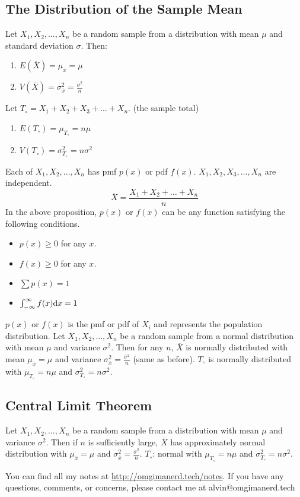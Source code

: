 \documentclass[letterpaper, 12pt]{math}
\begin{document}
\subsection*{The Distribution of the Sample Mean}
Let \( X_{1},X_{2},\dots,X_{n} \) be a random sample from a distribution with
mean \( \mu \) and standard deviation \( \sigma \). Then:
\begin{enumerate}
  \item \( E(\overline{X}) = \mu_{\overline{x}} = \mu \)
  \item \( V(\overline{X}) = \sigma_{\overline{x}}^{2} = \frac{\sigma^{2}}{n} \)
\end{enumerate}
Let \( T_{\circ} = X_{1}+X_{2}+X_{3}+\dots+X_{n} \). (the sample total)
\begin{enumerate}
  \item \( E(T_{\circ}) = \mu_{T_{\circ}} = n\mu \)
  \item \( V(T_{\circ}) = \sigma_{T_{\circ}}^{2} = n\sigma^{2} \)
\end{enumerate}
Each of \( X_{1},X_{2},\dots,X_{n} \) has pmf \( p(x) \) or pdf \( f(x) \).
\( X_{1},X_{2},X_{3},\dots,X_{n} \) are independent.
\[ \overline{X} = \frac{X_{1}+X_{2}+\dots+X_{n}}{n} \]
In the above proposition, \( p(x) \) or \( f(x) \) can be any function
satisfying the following conditions.
\begin{itemize}
  \item \( p(x)\geq 0 \) for any \( x \).
  \item \( f(x)\geq 0 \) for any \( x \).
  \item \( \sum p(x) = 1 \)
  \item \( \int_{-\infty}^{\infty}f(x)\mathrm{d}{x} = 1 \)
\end{itemize}
\( p(x) \) or \( f(x) \) is the pmf or pdf of \( X_{i} \) and represents the
population distribution. Let \( X_{1},X_{2},\dots,X_{n} \) be a random
sample from a normal distribution with mean \( \mu \) and variance
\( \sigma^{2} \). Then for any \( n \), \( \overline{X} \) is normally
distributed with mean \( \mu_{\overline{x}} = \mu \) and variance
\( \sigma_{\overline{x}}^{2} = \frac{\sigma^{2}}{n} \) (same as before).
\( T_{\circ} \) is normally distributed with \( \mu_{T_{\circ}} = n\mu \)
and \( \sigma_{T_{\circ}}^{2} = n\sigma^{2} \).

\subsection*{Central Limit Theorem}
Let \( X_{1},X_{2},\dots,X_{n} \) be a random sample from a distribution
with mean \( \mu \) and variance \( \sigma^{2} \). Then if \( n \) is
sufficiently large, \( \overline{X} \) has approximately normal distribution
with \( \mu_{\overline{x}} = \mu \) and \( \sigma_{\overline{x}}^{2} =
\frac{\sigma^{2}}{n} \). \( T_{\circ} \): normal with \( \mu_{T_{\circ}} =
n\mu \) and \( \sigma_{T_{\circ}}^{2} = n\sigma^{2} \).

\begin{center}
  You can find all my notes at \url{http://omgimanerd.tech/notes}. If you have
  any questions, comments, or concerns, please contact me at
  alvin@omgimanerd.tech
\end{center}
\end{document}
